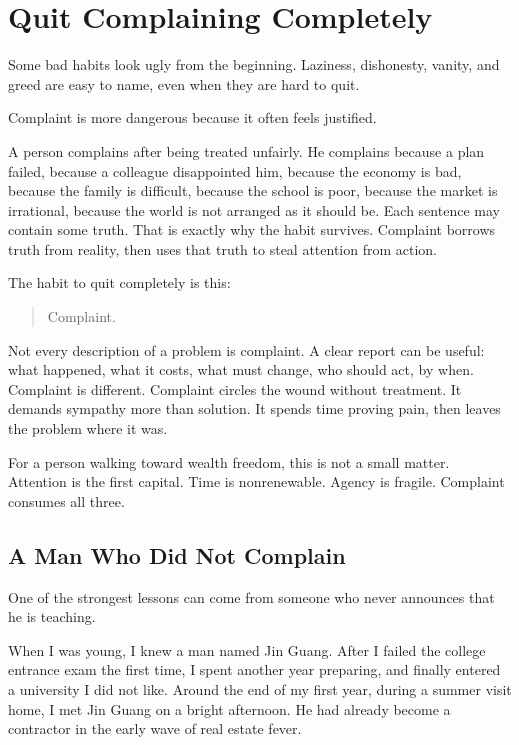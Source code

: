\chapter{Quit Complaining Completely}

Some bad habits look ugly from the beginning. Laziness, dishonesty, vanity, and greed are easy to name, even when they are hard to quit.

Complaint is more dangerous because it often feels justified.

A person complains after being treated unfairly. He complains because a plan failed, because a colleague disappointed him, because the economy is bad, because the family is difficult, because the school is poor, because the market is irrational, because the world is not arranged as it should be. Each sentence may contain some truth. That is exactly why the habit survives. Complaint borrows truth from reality, then uses that truth to steal attention from action.

The habit to quit completely is this:

\begin{quote}
Complaint.
\end{quote}

Not every description of a problem is complaint. A clear report can be useful: what happened, what it costs, what must change, who should act, by when. Complaint is different. Complaint circles the wound without treatment. It demands sympathy more than solution. It spends time proving pain, then leaves the problem where it was.

For a person walking toward wealth freedom, this is not a small matter. Attention is the first capital. Time is nonrenewable. Agency is fragile. Complaint consumes all three.

\section*{A Man Who Did Not Complain}

One of the strongest lessons can come from someone who never announces that he is teaching.

When I was young, I knew a man named Jin Guang. After I failed the college entrance exam the first time, I spent another year preparing, and finally entered a university I did not like. Around the end of my first year, during a summer visit home, I met Jin Guang on a bright afternoon. He had already become a contractor in the early wave of real estate fever.

